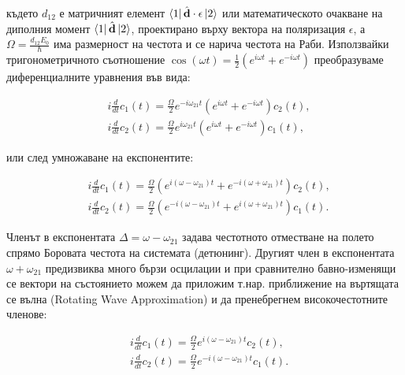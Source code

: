     където $d_{12}$ е матричният елемент $\bra{1}\hat{\textbf{d}}\cdot\textbf{$\epsilon$}\ket{2}$ или математическото очакване на диполния момент $\bra{1}\hat{\textbf{d}}\ket{2}$, проектирано върху вектора на поляризация \textbf{$\epsilon$},
    а $\Omega=\frac{d_{12}E_0}{\hbar}$ има размерност на честота и се нарича честота на Раби. Използвайки тригонометричното съотношение $\cos(\omega t) =\frac{1}{2} \left(e^{\textit{i}\omega t}+e^{-\textit{i}\omega t}\right)$ преобразуваме
    диференциалните уравнения във вида:
    
    \begin{subequations}
        \begin{align}
            & \textit{i}\frac{d}{dt}c_1(t) = \frac{\Omega}{2}e^{-\textit{i}\omega_{21} t}\left(e^{\textit{i}\omega t}+e^{-\textit{i}\omega t}\right)c_2(t),\\
            & \textit{i}\frac{d}{dt}c_2(t) = \frac{\Omega}{2}e^{\textit{i}\omega_{21} t}\left(e^{\textit{i}\omega t}+e^{-\textit{i}\omega t}\right)c_1(t),
        \end{align}
    \end{subequations}

    или след умножаване на експонентите:
    
    \begin{subequations}
        \begin{align}
            & \textit{i}\frac{d}{dt}c_1(t) = \frac{\Omega}{2}\left(e^{\textit{i}(\omega -\omega_{21}) t}+e^{-\textit{i}(\omega +\omega_{21}) t}\right)c_2(t),\\
            & \textit{i}\frac{d}{dt}c_2(t) = \frac{\Omega}{2}\left(e^{-\textit{i}(\omega -\omega_{21}) t}+e^{\textit{i}(\omega +\omega_{21}) t}\right)c_1(t).
        \end{align}
    \end{subequations}

    Членът в експонентата $\Delta=\omega -\omega_{21}$ задава честотното отместване на полето спрямо Боровата честота на системата (детюнинг). Другият член в експонентата $\omega +\omega_{21}$
    предизвиква много бързи осцилации и при сравнително бавно-изменящи се вектори на състоянието можем да приложим т.нар. приближение на въртящата се вълна (Rotating Wave Approximation)
    и да пренебрегнем високочестотните членове:
    
    \begin{subequations}
        \begin{align}
            & \textit{i}\frac{d}{dt}c_1(t) = \frac{\Omega}{2}e^{\textit{i}(\omega -\omega_{21}) t}c_2(t),\\
            & \textit{i}\frac{d}{dt}c_2(t) = \frac{\Omega}{2}e^{-\textit{i}(\omega -\omega_{21}) t}c_1(t).
        \end{align}
    \end{subequations}

